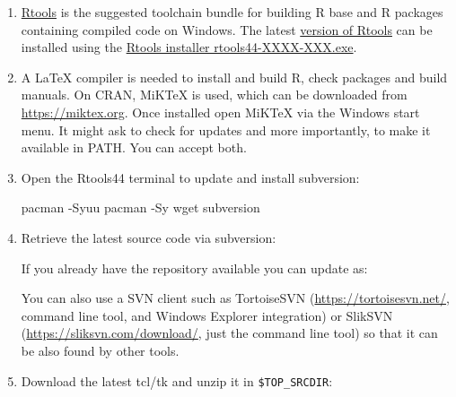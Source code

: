 \documentclass[
  letterpaper,
  DIV=11,
  numbers=noendperiod]{scrreprt}
\newenvironment{Shaded}{\begin{snugshade}}{\end{snugshade}}
\newcommand{\AttributeTok}[1]{\textcolor[rgb]{0.40,0.45,0.13}{#1}}
\newcommand{\BuiltInTok}[1]{\textcolor[rgb]{0.00,0.23,0.31}{#1}}
\newcommand{\ExtensionTok}[1]{\textcolor[rgb]{0.00,0.23,0.31}{#1}}
\newcommand{\FunctionTok}[1]{\textcolor[rgb]{0.28,0.35,0.67}{#1}}
\newcommand{\NormalTok}[1]{\textcolor[rgb]{0.00,0.23,0.31}{#1}}
\newcommand{\OperatorTok}[1]{\textcolor[rgb]{0.37,0.37,0.37}{#1}}
\newcommand{\StringTok}[1]{\textcolor[rgb]{0.13,0.47,0.30}{#1}}
\newcommand{\VariableTok}[1]{\textcolor[rgb]{0.07,0.07,0.07}{#1}}
\begin{document}
\begin{enumerate}
\def\labelenumi{\arabic{enumi}.}
\item
  \href{https://cran.r-project.org/bin/windows/Rtools/}{Rtools} is the
  suggested toolchain bundle for building R base and R packages
  containing compiled code on Windows. The latest
  \href{https://cran.r-project.org/bin/windows/Rtools/rtools44/rtools.html}{version
  of Rtools} can be installed using the
  \href{https://cran.r-project.org/bin/windows/Rtools/rtools44/files/}{Rtools
  installer rtools44-XXXX-XXX.exe}.
\item
  A LaTeX compiler is needed to install and build R, check packages and
  build manuals. On CRAN, MiKTeX is used, which can be downloaded from
  \url{https://miktex.org}. Once installed open MiKTeX via the Windows
  start menu. It might ask to check for updates and more importantly, to
  make it available in PATH. You can accept both.
\item
  Open the Rtools44 terminal to update and install subversion:

\begin{Shaded}
\begin{Highlighting}[]
\ExtensionTok{pacman} \AttributeTok{{-}Syuu}
\ExtensionTok{pacman} \AttributeTok{{-}Sy}\NormalTok{ wget subversion}
\end{Highlighting}
\end{Shaded}
\item
  Retrieve the latest source code via subversion:

\begin{Shaded}
\end{Shaded}

  If you already have the repository available you can update as:

\begin{Shaded}
\end{Shaded}

  You can also use a SVN client such as TortoiseSVN
  (\url{https://tortoisesvn.net/}, command line tool, and Windows
  Explorer integration) or SlikSVN (\url{https://sliksvn.com/download/},
  just the command line tool) so that it can be also found by other
  tools.
\item
  Download the latest tcl/tk and unzip it in \texttt{\$TOP\_SRCDIR}:


\end{enumerate}
\end{document}
